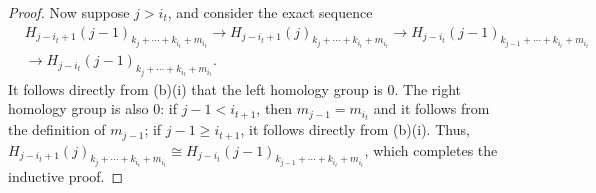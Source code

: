 \documentclass[10pt,a4paper]{amsart}
\begin{document}
\begin{proof}
    Now suppose $j > i_t$, and consider the exact sequence
    \begin{align*}
    &H_{j-i_t+1}(j-1)_{k_j+\cdots + k_{i_t} + m_{i_t}} \longrightarrow H_{j-i_t+1}(j)_{k_j+\cdots + k_{i_t} + m_{i_t}} \longrightarrow H_{j-i_t}(j-1)_{k_{j-1}+\cdots + k_{i_t} + m_{i_t}}\\
    &\longrightarrow H_{j-i_t}(j-1)_{k_j+\cdots + k_{i_t} + m_{i_t}}.
    \end{align*}
    It follows directly from (b)(i) that the left homology group is $0$. The right homology group is also $0$: if $j-1<i_{t+1}$, then $m_{j-1}=m_{i_t}$ and it follows from the definition of $m_{j-1}$; if $j-1\geq i_{t+1}$, it follows directly from (b)(i). Thus, $H_{j-i_t+1}(j)_{k_j+\cdots+k_{i_t}+m_{i_t}} \cong H_{j-i_t}(j-1)_{k_{j-1}+\cdots + k_{i_t} + m_{i_t}}$, which completes the inductive proof.
\end{proof}
\end{document}
